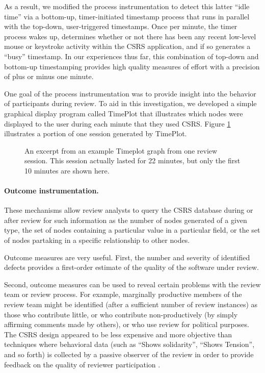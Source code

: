 As a result, we modified the process instrumentation to detect this latter
``idle time'' via a bottom-up, timer-initiated timestamp process that runs
in parallel with the top-down, user-triggered timestamps.  Once per minute,
the timer process wakes up, determines whether or not there has been any
recent low-level mouse or keystroke activity within the CSRS application,
and if so generates a ``busy'' timestamp. In our experiences thus far, this
combination of top-down and bottom-up timestamping provides high quality
measures of effort with a precision of plus or minus one minute.

One goal of the process instrumentation was to provide insight into the 
behavior of participants during review.  To aid in this investigation, we 
developed a simple graphical display program called TimePlot that
illustrates which nodes were displayed to the user during each minute that
they used CSRS.  Figure \ref{fig:timeplot} illustrates a portion of one 
session generated by TimePlot.



\begin{figure}
\tiny

\normalsize
\caption{An excerpt from an example Timeplot graph from one review
session. This session actually lasted for 
22 minutes, but only the first 10 minutes are shown here.}
\label{fig:timeplot}
\end{figure}


\paragraph{Outcome instrumentation.} 

These mechanisms allow review analysts to query the CSRS database
during or after review for such information as the number of nodes
generated of a given type, the set of nodes containing a particular
value in a particular field, or the set of nodes partaking in a
specific relationship to other nodes.

Outcome measures are very useful. First, the number and severity
of identified defects provides a first-order estimate of the quality of the
software under review.

Second, outcome measures can be used to reveal certain problems with the
review team or review process.  For example, marginally productive members
of the review team might be identified (after a sufficient number of review
instances) as those who contribute little, or who contribute
non-productively (by simply affirming comments made by others), or who use
review for political purposes.  The CSRS design appeared to be less
expensive and more objective than techniques where behavioral data (such as
``Shows solidarity'', ``Shows Tension'', and so forth) is collected by a
passive observer of the review in order to provide feedback on the quality
of reviewer participation \cite{Freedman90}.

